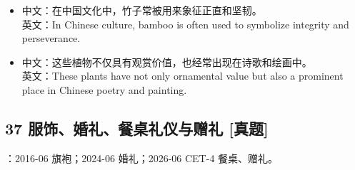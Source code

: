 \documentclass[a4paper,11pt,UTF8,fontset=none]{ctexart}
\begin{document}
\begin{itemize}[leftmargin=1.7em,itemsep=1pt,parsep=0pt,topsep=2pt]
\item \noindent 中文：在中国文化中，竹子常被用来象征正直和坚韧。\\ 英文：In Chinese culture, bamboo is often used to symbolize integrity and perseverance.\par


\item \noindent 中文：这些植物不仅具有观赏价值，也经常出现在诗歌和绘画中。\\ 英文：These plants have not only ornamental value but also a prominent place in Chinese poetry and painting.\par


\end{itemize}

\subsection{37 服饰、婚礼、餐桌礼仪与赠礼 {\color{AccentBlue} [真题]}}

\begin{tcolorbox}[enhanced,breakable,boxrule=0.35pt,colback=VeryPaleBlue,colframe=AccentBlue!40,left=7pt,right=7pt,top=4pt,bottom=4pt,borderline west={2pt}{0pt}{AccentBlue},before skip=4pt,after skip=6pt]
：2016-06 旗袍；2024-06 婚礼；2026-06 CET-4 餐桌、赠礼。\par


\end{tcolorbox}
\end{document}
